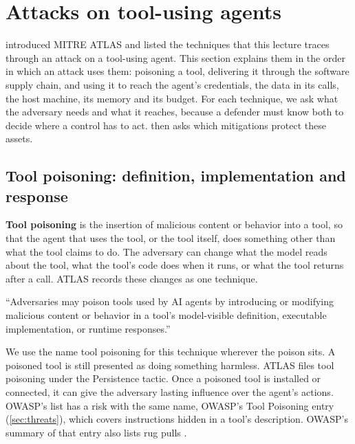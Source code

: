\section{Attacks on tool-using agents}
\label{sec:attacks}

 introduced MITRE ATLAS and listed the techniques that this lecture traces
through an attack on a tool-using agent. This section explains them in the order in which an attack
uses them: poisoning a tool, delivering it through the software supply chain, and using it to reach
the agent's credentials, the data in its calls, the host machine, its memory and its budget. For
each technique, we ask what the adversary needs and what it reaches, because a defender must know
both to decide where a control has to act.  then asks which mitigations
protect these assets.

\subsection{Tool poisoning: definition, implementation and response}
\label{sec:attacks-poisoning}

\textbf{Tool poisoning} is the insertion of malicious content or behavior into a tool, so that the
agent that uses the tool, or the tool itself, does something other than what the tool claims to do.
The adversary can change what the model reads about the tool, what the tool's code does when it
runs, or what the tool returns after a call. ATLAS records these changes as one technique.

\begin{definition}
\label{def:attacks-poisoning}
``Adversaries may poison tools used by AI agents by introducing or modifying malicious content or
behavior in a tool's model-visible definition, executable implementation, or runtime responses.''
\citep{mitre-atlas-2026}
\end{definition}

We use the name tool poisoning for this technique wherever the poison sits. A poisoned tool is
still presented as doing something harmless. ATLAS files tool poisoning under the Persistence
tactic. Once a poisoned tool is installed or connected, it can give the adversary lasting influence
over the agent's actions. OWASP's list has a risk with the same name, OWASP's Tool Poisoning entry
(\cref{sec:threats}), which covers instructions hidden in a tool's description. OWASP's summary of
that entry also lists rug pulls \citep{owasp-mcp-top10}.

